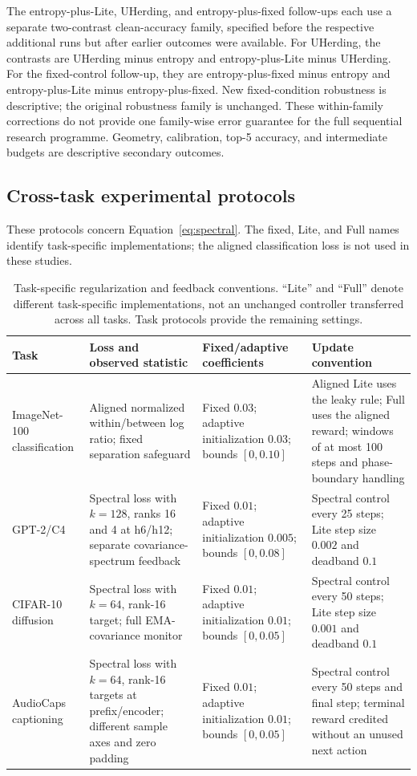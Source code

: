 \documentclass[a4paper,fleqn]{cas-dc}
\let\CAENLcaption\caption
\let\caption\CAENLcaption
\begin{document}
The entropy-plus-Lite, UHerding, and entropy-plus-fixed follow-ups each
use a separate two-contrast clean-accuracy family, specified before the
respective additional runs but after earlier outcomes were available.
For UHerding, the contrasts are UHerding minus entropy and
entropy-plus-Lite minus UHerding. For the fixed-control follow-up, they
are entropy-plus-fixed minus entropy and entropy-plus-Lite minus
entropy-plus-fixed. New fixed-condition robustness is descriptive;
the original robustness family is unchanged.
These within-family corrections do not provide one family-wise
error guarantee for the full sequential research programme.
Geometry, calibration, top-5 accuracy, and intermediate budgets
are descriptive secondary outcomes.

\subsection{Cross-task experimental protocols}\label{sec:cross_protocols}
These protocols concern Equation~\eqref{eq:spectral}. The fixed, Lite,
and Full names identify task-specific implementations; the aligned
classification loss is not used in these studies.
\begin{table}[pos=tbp]
\caption{Task-specific regularization and feedback conventions.
``Lite'' and ``Full'' denote different task-specific implementations,
not an unchanged controller transferred across all tasks.
Task protocols provide the remaining settings.}
\label{tab:control_variants}
\centering\small
\begin{tabularx}{\textwidth}{@{}p{}YYY@{}}
\toprule
Task & Loss and observed statistic & Fixed/adaptive coefficients &
Update convention \\
\midrule
ImageNet-100 classification &
Aligned normalized within/between log ratio; fixed separation safeguard &
Fixed $0.03$; adaptive initialization $0.03$; bounds $[0,0.10]$ &
Aligned Lite uses the leaky rule; Full uses the aligned reward;
windows of at most 100 steps and phase-boundary handling \\
GPT-2/C4 &
Spectral loss with $k=128$, ranks 16 and 4 at h6/h12;
separate covariance-spectrum feedback &
Fixed $0.01$; adaptive initialization $0.005$;
bounds $[0,0.08]$ &
Spectral control every 25 steps;
Lite step size $0.002$ and deadband $0.1$ \\
CIFAR-10 diffusion &
Spectral loss with $k=64$, rank-16 target;
full EMA-covariance monitor &
Fixed $0.01$; adaptive initialization $0.01$;
bounds $[0,0.05]$ &
Spectral control every 50 steps;
Lite step size $0.001$ and deadband $0.1$ \\
AudioCaps captioning &
Spectral loss with $k=64$, rank-16 targets at prefix/encoder;
different sample axes and zero padding &
Fixed $0.01$; adaptive initialization $0.01$;
bounds $[0,0.05]$ &
Spectral control every 50 steps and final step;
terminal reward credited without an unused next action \\
\bottomrule
\end{tabularx}
\end{table}
\end{document}

